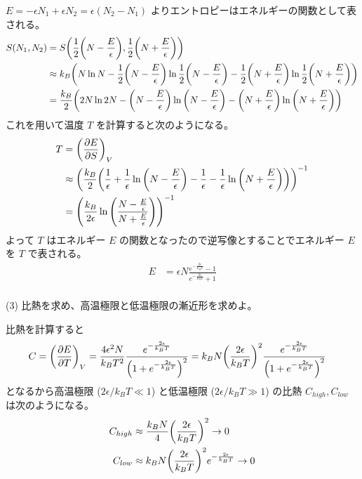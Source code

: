 \documentclass[a4paper,dvipdfmx]{jsarticle}
\theoremstyle{definition}
\begin{document}
$E = -\epsilon N_1 + \epsilon N_2 = \epsilon (N_2 - N_1)$ よりエントロピーはエネルギーの関数として表される。
\begin{align}
  S(N_1, N_2) & = S\qty(\frac{1}{2}\qty(N - \frac{E}{\epsilon}), \frac{1}{2}\qty(N + \frac{E}{\epsilon}))                                                                                                         \\
              & \approx k_B\qty(N\ln N - \frac{1}{2}\qty(N - \frac{E}{\epsilon})\ln \frac{1}{2}\qty(N - \frac{E}{\epsilon}) - \frac{1}{2}\qty(N + \frac{E}{\epsilon})\ln \frac{1}{2}\qty(N + \frac{E}{\epsilon})) \\
              & = \frac{k_B}{2}\qty(2N\ln 2N - \qty(N - \frac{E}{\epsilon})\ln\qty(N - \frac{E}{\epsilon}) - \qty(N + \frac{E}{\epsilon})\ln\qty(N + \frac{E}{\epsilon}))
\end{align}
これを用いて温度 $T$ を計算すると次のようになる。
\begin{align}
  T & = \qty(\pdv{E}{S})_V                                                                                                                                                                  \\
    & \approx \qty(\frac{k_B}{2}\qty(\frac{1}{\epsilon} + \frac{1}{\epsilon}\ln\qty(N - \frac{E}{\epsilon}) - \frac{1}{\epsilon} - \frac{1}{\epsilon}\ln\qty(N + \frac{E}{\epsilon})))^{-1} \\
    & = \qty(\frac{k_B}{2\epsilon}\ln\qty(\frac{N - \frac{E}{\epsilon}}{N + \frac{E}{\epsilon}}))^{-1}
\end{align}
よって $T$ はエネルギー $E$ の関数となったので逆写像とすることでエネルギー $E$ を $T$ で表される。
\begin{align}
  E & = \epsilon N\frac{e^{-\frac{2\epsilon}{k_BT}} - 1}{e^{-\frac{2\epsilon}{k_BT}} + 1}
\end{align} \\

(3) 比熱を求め、高温極限と低温極限の漸近形を求めよ。

比熱を計算すると
\begin{align}
  C & = \qty(\pdv{E}{T})_V = \frac{4\epsilon^2N}{k_BT^2}\frac{e^{-\frac{2\epsilon}{k_BT}}}{\qty(1 + e^{-\frac{2\epsilon}{k_BT}})^2} = k_BN\qty(\frac{2\epsilon}{k_BT})^2\frac{e^{-\frac{2\epsilon}{k_BT}}}{\qty(1 + e^{-\frac{2\epsilon}{k_BT}})^2}
\end{align}
となるから高温極限 ($2\epsilon/k_BT \ll 1$) と低温極限 ($2\epsilon/k_BT \gg 1$) の比熱 $C_{high}, C_{low}$ は次のようになる。
\begin{align}
  C_{high} & \approx \frac{k_BN}{4}\qty(\frac{2\epsilon}{k_BT})^2 \to 0                  \\
  C_{low}  & \approx k_BN\qty(\frac{2\epsilon}{k_BT})^2e^{-\frac{2\epsilon}{k_BT}} \to 0
\end{align}
\end{document}
